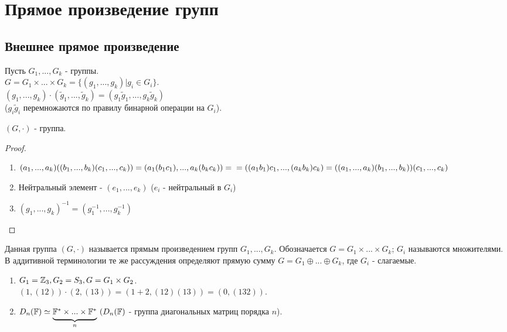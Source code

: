 \section{Прямое произведение групп}
\subsection{Внешнее прямое произведение}
    Пусть $G_1,...,G_k$ - группы.\\
    $G = G_1 \times ... \times G_k = \{(g_1,...,g_k)| g_i \in G_i\}$.\\
    $(g_1,...,g_k)\cdot(\tilde{g}_1,...,\tilde{g}_k) = (g_1\tilde{g}_1,...,g_k\tilde{g}_k)$\\
    ($g_i\tilde{g}_i$ перемножаются по правилу бинарной операции на $G_i$).
\begin{subtheorem}
    $(G, \cdot)$ - группа.
\end{subtheorem}
\begin{proof}\tab
    \begin{enumerate}
        \item $(a_1,...,a_k)((b_1,...,b_k)(c_1,...,c_k)) = (a_1(b_1c_1),...,a_k(b_kc_k)) =\\= ((a_1b_1)c_1,...,(a_kb_k)c_k) = ((a_1,...,a_k)(b_1,...,b_k))(c_1,...,c_k)$ 
        \item Нейтральный элемент - $(e_1,...,e_k)$ ($e_i$ - нейтральный в $G_i$)
        \item $(g_1,...,g_k)^{-1} = (g_1^{-1},...,g_k^{-1})$ 
    \end{enumerate}
\end{proof}
\begin{definition}
    Данная группа $(G, \cdot)$ называется прямым произведением групп $G_1,...,G_k$. Обозначается $G = G_1 \times ... \times G_k$; $G_i$ называются множителями.\\
    В аддитивной терминологии те же рассуждения определяют прямую сумму $G = G_1 \oplus ... \oplus G_k$, где $G_i$ - слагаемые.
\end{definition}
\begin{examples}\tab
    \begin{enumerate}
        \item $G_1 = \mathbb{Z}_3, G_2 = S_3, G = G_1 \times G_2$.\\
        $(1, (12))\cdot (2, (13)) = (1+2, (12)(13)) = (0, (132))$.
        \item $D_n(\F) \simeq \undermat{n}{\F^* \times ... \times \F^*} \ (D_n(\F)$ - группа диагональных матриц порядка $n$). 
    \end{enumerate}
\end{examples}
